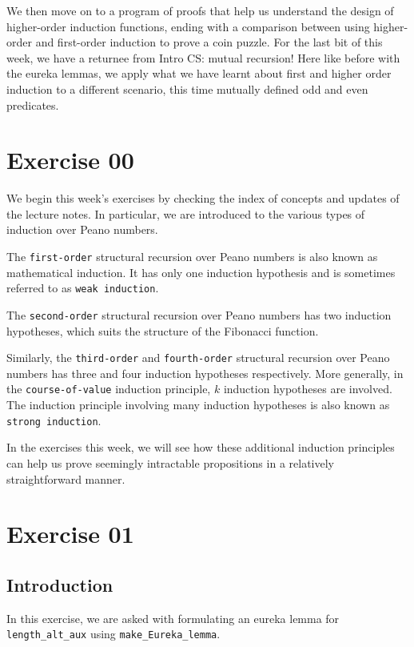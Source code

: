 \documentclass{article}
\begin{document}
We then move on to a program of proofs that help us understand the design of higher-order induction functions, ending with a comparison between using higher-order and first-order induction to prove a coin puzzle. For the last bit of this week, we have a returnee from Intro CS: mutual recursion! Here like before with the eureka lemmas, we apply what we have learnt about first and higher order induction to a different scenario, this time mutually defined odd and even predicates.


\section{Exercise 00}
We begin this week's exercises by checking the index of concepts and updates of the lecture notes. In particular, we are introduced to the various types of induction over Peano numbers. 

The \texttt{first-order} structural recursion over Peano numbers is also known as mathematical induction. It has only one induction hypothesis and is sometimes referred to as \texttt{weak induction}.

The \texttt{second-order} structural recursion over Peano numbers has two induction hypotheses, which suits the structure of the Fibonacci function.

Similarly, the \texttt{third-order} and \texttt{fourth-order} structural recursion over Peano numbers has three and four induction hypotheses respectively. More generally, in the \texttt{course-of-value} induction principle, $k$ induction hypotheses are involved. The induction principle involving many induction hypotheses is also known as \texttt{strong induction}.

In the exercises this week, we will see how these additional induction principles can help us prove seemingly intractable propositions in a relatively straightforward manner. 

\section{Exercise 01}

\subsection{Introduction}

In this exercise, we are asked with formulating an eureka lemma for \texttt{length\_alt\_aux} using \texttt{make\_Eureka\_lemma}.
\end{document}
